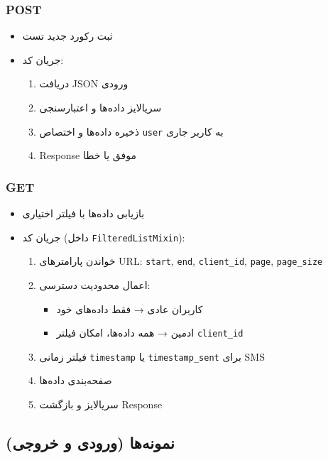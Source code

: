 \documentclass{report}
\begin{document}
\subsubsection{POST}
\begin{itemize}
    \item ثبت رکورد جدید تست
    \item جریان کد:
    \begin{enumerate}
        \item دریافت JSON ورودی
        \item سریالایز داده‌ها و اعتبارسنجی
        \item ذخیره داده‌ها و اختصاص \texttt{user} به کاربر جاری
        \item Response موفق  یا خطا 
    \end{enumerate}
\end{itemize}

\subsubsection{GET}
\begin{itemize}
    \item بازیابی داده‌ها با فیلتر اختیاری
    \item جریان کد (داخل \texttt{FilteredListMixin}):
    \begin{enumerate}
        \item خواندن پارامترهای URL: \texttt{start}, \texttt{end}, \texttt{client\_id}, \texttt{page}, \texttt{page\_size}
        \item اعمال محدودیت دسترسی:
        \begin{itemize}
            \item کاربران عادی → فقط داده‌های خود
            \item ادمین → همه داده‌ها، امکان فیلتر \texttt{client\_id}
        \end{itemize}
        \item فیلتر زمانی \texttt{timestamp} یا \texttt{timestamp\_sent} برای SMS
        \item صفحه‌بندی داده‌ها
        \item سریالایز و بازگشت Response
    \end{enumerate}
\end{itemize}

\subsection{نمونه‌ها (ورودی و خروجی)}
\end{document}
